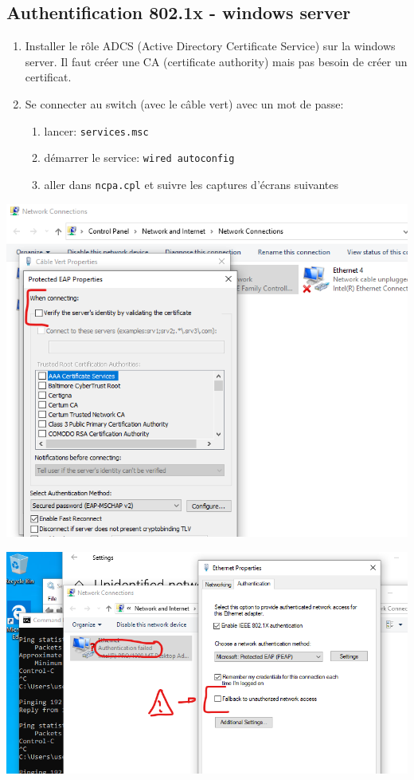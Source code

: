 \documentclass[a4paper]{article}
\begin{document}
\subsection{Authentification 802.1x - windows server}





\begin{enumerate}

\item Installer le rôle ADCS (Active Directory Certificate Service) sur la windows server. Il faut créer une CA (certificate authority) mais pas besoin de créer un certificat.

\item Se connecter au switch (avec le câble vert) avec un mot de passe:
\begin{enumerate}
    \item lancer: \texttt{services.msc}
    \item démarrer le service: \texttt{wired autoconfig}
    \item aller dans \texttt{ncpa.cpl} et suivre les captures d'écrans suivantes
\end{enumerate}

\end{enumerate}
\begin{center} \includegraphics[width=0.75\linewidth]{images/connect-03.png} \end{center}
\begin{center} \includegraphics[width=0.90\linewidth]{images/connect-02.png} \end{center}
\end{document}
